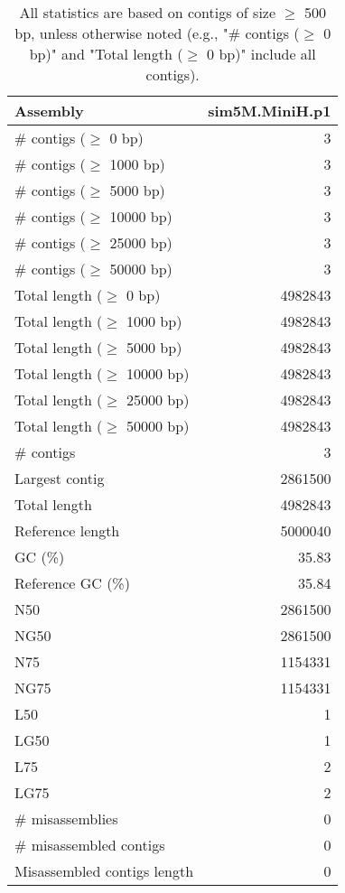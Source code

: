 \documentclass[12pt,a4paper]{article}
\begin{document}
\begin{table}[ht]
\begin{center}
\caption{All statistics are based on contigs of size $\geq$ 500 bp, unless otherwise noted (e.g., "\# contigs ($\geq$ 0 bp)" and "Total length ($\geq$ 0 bp)" include all contigs).}
\begin{tabular}{|l*{1}{|r}|}
\hline
Assembly & sim5M.MiniH.p1 \\ \hline
\# contigs ($\geq$ 0 bp) & 3 \\ \hline
\# contigs ($\geq$ 1000 bp) & 3 \\ \hline
\# contigs ($\geq$ 5000 bp) & 3 \\ \hline
\# contigs ($\geq$ 10000 bp) & 3 \\ \hline
\# contigs ($\geq$ 25000 bp) & 3 \\ \hline
\# contigs ($\geq$ 50000 bp) & 3 \\ \hline
Total length ($\geq$ 0 bp) & 4982843 \\ \hline
Total length ($\geq$ 1000 bp) & 4982843 \\ \hline
Total length ($\geq$ 5000 bp) & 4982843 \\ \hline
Total length ($\geq$ 10000 bp) & 4982843 \\ \hline
Total length ($\geq$ 25000 bp) & 4982843 \\ \hline
Total length ($\geq$ 50000 bp) & 4982843 \\ \hline
\# contigs & 3 \\ \hline
Largest contig & 2861500 \\ \hline
Total length & 4982843 \\ \hline
Reference length & 5000040 \\ \hline
GC (\%) & 35.83 \\ \hline
Reference GC (\%) & 35.84 \\ \hline
N50 & 2861500 \\ \hline
NG50 & 2861500 \\ \hline
N75 & 1154331 \\ \hline
NG75 & 1154331 \\ \hline
L50 & 1 \\ \hline
LG50 & 1 \\ \hline
L75 & 2 \\ \hline
LG75 & 2 \\ \hline
\# misassemblies & 0 \\ \hline
\# misassembled contigs & 0 \\ \hline
Misassembled contigs length & 0 \\ \hline

\end{tabular}
\end{center}
\end{table}
\end{document}
